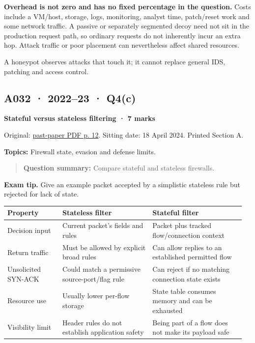 \documentclass[11pt,a4paper]{article}
\begin{document}
\textbf{Overhead is not zero and has no fixed percentage in the question.} Costs include a VM/\allowbreak{}host,\allowbreak{} storage,\allowbreak{} logs,\allowbreak{} monitoring,\allowbreak{} analyst time,\allowbreak{} patch/\allowbreak{}reset work and some network traffic. A passive or separately segmented decoy need not sit in the production request path,\allowbreak{} so ordinary requests do not inherently incur an extra hop. Attack traffic or poor placement can nevertheless affect shared resources.


A honeypot observes attacks that touch it; it cannot replace general IDS,\allowbreak{} patching and access control.




\clearpage
\subsection{A032 · 2022–23 · Q4(c)}\label{a032}

\textbf{Stateful versus stateless filtering · 7 marks}


Original: \href{../../CSE405-Security_Merged.pdf\#page=12}{past-paper PDF p. 12}. Sitting date: 18 April 2024. Printed Section A.


\textbf{Topics:} Firewall state,\allowbreak{} evasion and defense limits.



\begin{quote}\small

\textbf{Question summary:} Compare stateful and stateless firewalls.



\end{quote}


{\color{ForestGreen}\textbf{Exam tip.} Give an example packet accepted by a simplistic stateless rule but rejected for lack of state.}



{\small\setlength{\tabcolsep}{3pt}
\begin{longtable}{>{\raggedright\arraybackslash}p{0.22669\linewidth}>{\raggedright\arraybackslash}p{0.36032\linewidth}>{\raggedright\arraybackslash}p{0.37141\linewidth}}
\toprule
\textbf{Property} & \textbf{Stateless filter} & \textbf{Stateful filter} \\
\midrule
\endhead
Decision input & Current packet's fields and rules & Packet plus tracked flow/\allowbreak{}connection context \\
Return traffic & Must be allowed by explicit broad rules & Can allow replies to an established permitted flow \\
Unsolicited SYN-ACK & Could match a permissive source-port/\allowbreak{}flag rule & Can reject if no matching connection state exists \\
Resource use & Usually lower per-flow storage & State table consumes memory and can be exhausted \\
Visibility limit & Header rules do not establish application safety & Being part of a flow does not make its payload safe \\
\bottomrule
\end{longtable}
}
\end{document}
